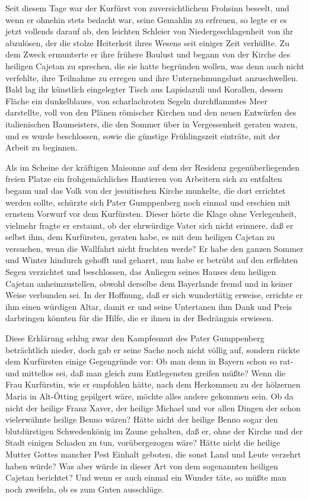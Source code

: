 Seit diesem Tage war der Kurfürst von zuversichtlichem Frohsinn
beseelt, und wenn er ohnehin stets bedacht war, \pagenum{[120]}
seine Gemahlin zu erfreuen, so legte er es jetzt vollends darauf
ab, den leichten Schleier von Niedergeschlagenheit von ihr
abzulösen, der die stolze Heiterkeit ihres Wesens seit einiger Zeit
verhüllte. Zu dem Zweck ermunterte er ihre frühere Baulust und
begann von der Kirche des heiligen Cajetan zu sprechen, die sie
hatte begründen wollen, was denn auch nicht verfehlte, ihre
Teilnahme zu erregen und ihre Unternehmungslust anzuschwellen. Bald
lag ihr künstlich eingelegter Tisch aus Lapislazuli und Korallen,
dessen Fläche ein dunkelblaues, von scharlachroten Segeln
durchflammtes Meer darstellte, voll von den Plänen römischer
Kirchen und den neuen Entwürfen des italienischen Baumeisters, die
den Sommer über in Vergessenheit geraten waren, und es wurde
beschlossen, sowie die günstige Frühlingszeit einträte, mit der
Arbeit zu beginnen.

Als im Scheine der kräftigen Maisonne auf dem der Residenz
gegenüberliegenden freien Platze ein frohgemächliches Hantieren von
Arbeitern sich zu entfalten begann und das Volk von der
jesuitischen Kirche munkelte, die dort errichtet werden sollte,
schürzte sich Pater Gumppenberg noch einmal und erschien mit
ernstem Vorwurf vor dem Kurfürsten. Dieser hörte die Klage ohne
Verlegenheit, vielmehr fragte er erstaunt, ob der ehrwürdige Vater
sich nicht erinnere, daß er selbst ihm, dem Kurfürsten, geraten
habe, es mit dem heiligen Cajetan zu versuchen, wenn die Wallfahrt
nicht fruchten werde? Er habe den ganzen Sommer und Winter hindurch
gehofft und geharrt, nun habe er betrübt auf den erflehten Segen
verzichtet und beschlossen, das Anliegen seines Hauses dem heiligen
Cajetan anheimzustellen, obwohl derselbe dem Bayerlande fremd und
in keiner Weise verbunden sei. In der Hoffnung, daß er sich
\pagenum{[121]} wundertätig erweise, errichte er ihm einen würdigen
Altar, damit er und seine Untertanen ihm Dank und Preis darbringen
könnten für die Hilfe, die er ihnen in der Bedrängnis erwiesen.

Diese Erklärung schlug zwar den Kampfesmut des Pater Gumppenberg
beträchtlich nieder, doch gab er seine Sache noch nicht völlig auf,
sondern rückte dem Kurfürsten einige Gegengründe vor: Ob man denn
in Bayern schon so rat- und mittellos sei, daß man gleich zum
Entlegensten greifen müßte? Wenn die Frau Kurfürstin, wie er
empfohlen hätte, nach dem Herkommen zu der hölzernen Maria in
Alt-Ötting gepilgert wäre, möchte alles andere gekommen sein. Ob da
nicht der heilige Franz Xaver, der heilige Michael und vor allen
Dingen der schon vielerwähnte heilige Benno wären? Hätte nicht der
heilige Benno sogar den blutdürstigen Schwedenkönig im Zaune
gehalten, daß er, ohne der Kirche und der Stadt einigen Schaden zu
tun, vorübergezogen wäre? Hätte nicht die heilige Mutter Gottes
mancher Pest Einhalt geboten, die sonst Land und Leute verzehrt
haben würde? Was aber würde in dieser Art von dem sogenannten
heiligen Cajetan berichtet? Und wenn er auch einmal ein Wunder
täte, so müßte man noch zweifeln, ob es zum Guten ausschlüge.


